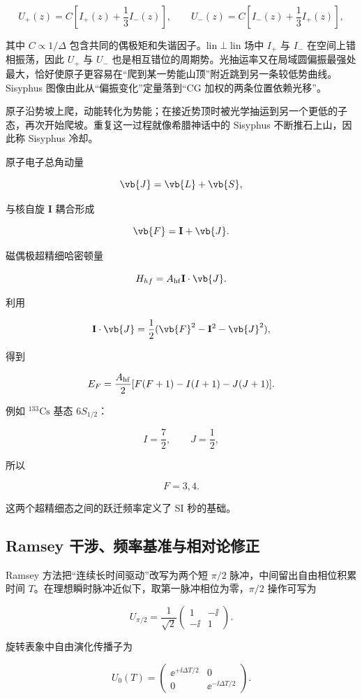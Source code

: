 \[
U_+(z)=C\left[I_+(z)+\frac13 I_-(z)\right],
\qquad
U_-(z)=C\left[I_-(z)+\frac13 I_+(z)\right],
\]

其中 \(C\propto1/\Delta\) 包含共同的偶极矩和失谐因子。lin\(\perp\)lin 场中 \(I_+\) 与 \(I_-\) 在空间上错相振荡，因此 \(U_+\) 与 \(U_-\) 也是相互错位的周期势。光抽运率又在局域圆偏振最强处最大，恰好使原子更容易在“爬到某一势能山顶”附近跳到另一条较低势曲线。Sisyphus 图像由此从“偏振变化”定量落到“CG 加权的两条位置依赖光移”。

原子沿势坡上爬，动能转化为势能；在接近势顶时被光学抽运到另一个更低的子态，再次开始爬坡。重复这一过程就像希腊神话中的 Sisyphus 不断推石上山，因此称 Sisyphus 冷却。

原子电子总角动量

\[
\vb{J}=\vb{L}+\vb{S},
\]

与核自旋 \(\mathbf I\) 耦合形成

\[
\vb{F}=\mathbf I+\vb{J}.
\]

磁偶极超精细哈密顿量

\[
H_{hf}=A_{\rm hf}\mathbf I\cdot\vb{J}.
\]

利用

\[
\mathbf I\cdot\vb{J}
=\frac12(\vb{F}^2-\mathbf I^2-\vb{J}^2),
\]

得到

\[
E_F
=\frac{A_{\rm hf}}2
[F(F+1)-I(I+1)-J(J+1)]
.
\]

例如 \(^{133}\mathrm{Cs}\) 基态 \(6S_{1/2}\)：

\[
I=\frac72,\qquad J=\frac12,
\]

所以

\[
F=3,4.
\]

这两个超精细态之间的跃迁频率定义了 SI 秒的基础。

\subsection{Ramsey 干涉、频率基准与相对论修正}
Ramsey 方法把``连续长时间驱动''改写为两个短 \(\pi/2\) 脉冲，中间留出自由相位积累时间 \(T\)。在理想瞬时脉冲近似下，取第一脉冲相位为零，\(\pi/2\) 操作可写为

\[
U_{\pi/2}=\frac1{\sqrt2}
\begin{pmatrix}
1&-\ii\\
-\ii&1
\end{pmatrix}.
\]

旋转表象中自由演化传播子为

\[
U_0(T)=
\begin{pmatrix}
 \ee^{+\ii\Delta T/2}&0\\
0&\ee^{-\ii\Delta T/2}
\end{pmatrix}.
\]

